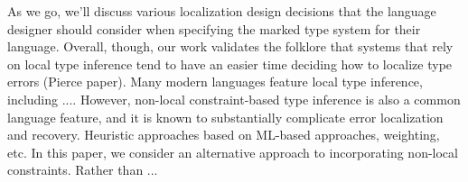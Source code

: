As we go, we'll discuss various localization design decisions that the language designer should consider when specifying the marked type system for their language. Overall, though, our work validates the folklore that systems that rely on local type inference tend to have an easier time deciding how to localize type errors (Pierce paper). Many modern languages feature local type inference, including .... 
However, non-local constraint-based type inference is also a common language feature, and it is known to substantially complicate error localization and recovery. 
Heuristic approaches based on ML-based approaches, weighting, etc.
In this paper, we consider an alternative approach to incorporating non-local constraints. Rather than ...

